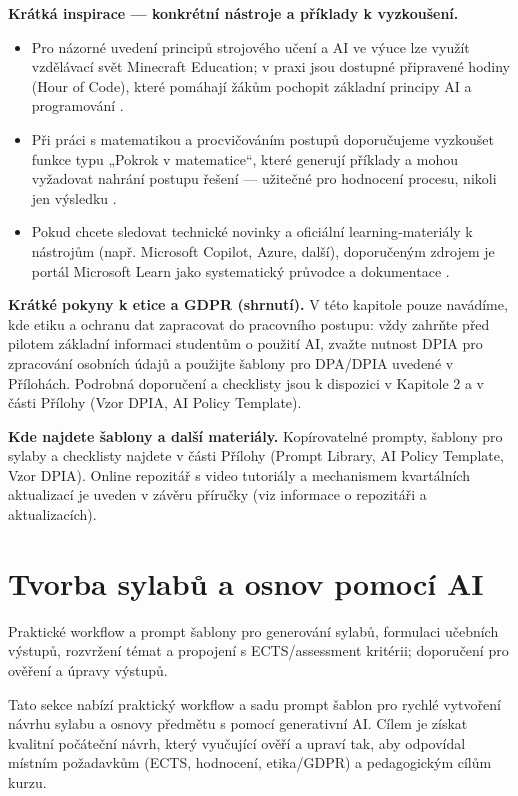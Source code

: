 \documentclass{report}%
\begin{document}
\medskip

\textbf{Krátká inspirace — konkrétní nástroje a příklady k vyzkoušení.}
\begin{itemize}
  \item Pro názorné uvedení principů strojového učení a AI ve výuce lze využít vzdělávací svět Minecraft Education; v praxi jsou dostupné připravené hodiny (Hour of Code), které pomáhají žákům pochopit základní principy AI a programování \cite{kb_ai_101_tipu_pdf_04e4a115_page_15_2}.
  \item Při práci s matematikou a procvičováním postupů doporučujeme vyzkoušet funkce typu „Pokrok v matematice“, které generují příklady a mohou vyžadovat nahrání postupu řešení — užitečné pro hodnocení procesu, nikoli jen výsledku \cite{kb_ai_101_tipu_pdf_04e4a115_page_8_1}.
  \item Pokud chcete sledovat technické novinky a oficiální learning‑materiály k nástrojům (např. Microsoft Copilot, Azure, další), doporučeným zdrojem je portál Microsoft Learn jako systematický průvodce a dokumentace \cite{kb_ai_101_tipu_pdf_04e4a115_page_54_1}.
\end{itemize}

\medskip

\textbf{Krátké pokyny k etice a GDPR (shrnutí).} V této kapitole pouze navádíme, kde etiku a ochranu dat zapracovat do pracovního postupu: vždy zahrňte před pilotem základní informaci studentům o použití AI, zvažte nutnost DPIA pro zpracování osobních údajů a použijte šablony pro DPA/DPIA uvedené v Přílohách. Podrobná doporučení a checklisty jsou k dispozici v Kapitole 2 a v části Přílohy (Vzor DPIA, AI Policy Template).

\medskip

\textbf{Kde najdete šablony a další materiály.} Kopírovatelné prompty, šablony pro sylaby a checklisty najdete v části Přílohy (Prompt Library, AI Policy Template, Vzor DPIA). Online repozitář s video tutoriály a mechanismem kvartálních aktualizací je uveden v závěru příručky (viz informace o repozitáři a aktualizacích).%

%
\section{Tvorba sylabů a osnov pomocí AI}%
Praktické workflow a prompt šablony pro generování sylabů, formulaci učebních výstupů, rozvržení témat a propojení s ECTS/assessment kritérii; doporučení pro ověření a úpravy výstupů.%


%
Tato sekce nabízí praktický workflow a sadu prompt šablon pro rychlé vytvoření návrhu sylabu a osnovy předmětu s pomocí generativní AI. Cílem je získat kvalitní počáteční návrh, který vyučující ověří a upraví tak, aby odpovídal místním požadavkům (ECTS, hodnocení, etika/GDPR) a pedagogickým cílům kurzu.
\end{document}
